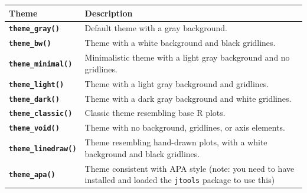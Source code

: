 \documentclass[
]{book}
\begin{document}
\begin{longtable}[]{@{}
  >{\raggedright\arraybackslash}p{}
  >{\raggedright\arraybackslash}p{}@{}}
\toprule\noalign{}
\begin{minipage}[b]{\linewidth}\raggedright
\textbf{Theme}
\end{minipage} & \begin{minipage}[b]{\linewidth}\raggedright
\textbf{Description}
\end{minipage} \\
\midrule\noalign{}
\endhead
\bottomrule\noalign{}
\endlastfoot
\textbf{\texttt{theme\_gray()}} & Default theme with a gray background. \\
\textbf{\texttt{theme\_bw()}} & Theme with a white background and black gridlines. \\
\textbf{\texttt{theme\_minimal()}} & Minimalistic theme with a light gray background and no gridlines. \\
\textbf{\texttt{theme\_light()}} & Theme with a light gray background and gridlines. \\
\textbf{\texttt{theme\_dark()}} & Theme with a dark gray background and white gridlines. \\
\textbf{\texttt{theme\_classic()}} & Classic theme resembling base R plots. \\
\textbf{\texttt{theme\_void()}} & Theme with no background, gridlines, or axis elements. \\
\textbf{\texttt{theme\_linedraw()}} & Theme resembling hand-drawn plots, with a white background and black gridlines. \\
\textbf{\texttt{theme\_apa()}} & Theme consistent with APA style (note: you need to have installed and loaded the \texttt{jtools} package to use this) \\
\end{longtable}

  
\end{document}
